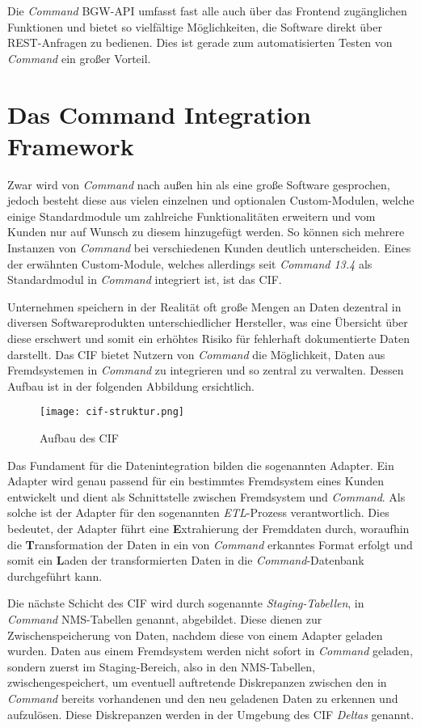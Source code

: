 Die \textit{Command} \ac{BGW}-\ac{API} umfasst fast alle auch über das Frontend zugänglichen Funktionen und bietet so vielfältige Möglichkeiten, die Software direkt über \ac{REST}-Anfragen zu bedienen. Dies ist gerade zum automatisierten Testen von \textit{Command} ein großer Vorteil.


\section{Das Command Integration Framework}\label{sec:cif}
Zwar wird von \textit{Command} nach außen hin als eine große Software gesprochen, jedoch besteht diese aus vielen einzelnen und optionalen Custom-Modulen, welche einige Standardmodule um zahlreiche Funktionalitäten erweitern und vom Kunden nur auf Wunsch zu diesem hinzugefügt werden. So können sich mehrere Instanzen von \textit{Command} bei verschiedenen Kunden deutlich unterscheiden. Eines der erwähnten Custom-Module, welches allerdings seit \textit{Command 13.4} als Standardmodul in \textit{Command} integriert ist, ist das \acf{CIF}.

Unternehmen speichern in der Realität oft große Mengen an Daten dezentral in diversen Softwareprodukten unterschiedlicher Hersteller, was eine Übersicht über diese erschwert und somit ein erhöhtes Risiko für fehlerhaft dokumentierte Daten darstellt. Das \ac{CIF} bietet Nutzern von \textit{Command} die Möglichkeit, Daten aus Fremdsystemen in \textit{Command} zu integrieren und so zentral zu verwalten. Dessen Aufbau ist in der folgenden Abbildung ersichtlich.

\begin{figure}[h]
    \centering
    \texttt{[image: cif-struktur.png]}
    \caption{Aufbau des \ac{CIF}}
\end{figure}

Das Fundament für die Datenintegration bilden die sogenannten Adapter. Ein Adapter wird genau passend für ein bestimmtes Fremdsystem eines Kunden entwickelt und dient als Schnittstelle zwischen Fremdsystem und \textit{Command}. Als solche ist der Adapter für den sogenannten \textit{ETL}-Prozess verantwortlich. Dies bedeutet, der Adapter führt eine \textbf{E}xtrahierung der Fremddaten durch, woraufhin die \textbf{T}ransformation der Daten in ein von \textit{Command} erkanntes Format erfolgt und somit ein \textbf{L}aden der transformierten Daten in die \textit{Command}-Datenbank durchgeführt kann.

Die nächste Schicht des \ac{CIF} wird durch sogenannte \textit{Staging-Tabellen}, in \textit{Command} \ac{NMS}-Tabellen genannt, abgebildet. Diese dienen zur Zwischenspeicherung von Daten, nachdem diese von einem Adapter geladen wurden. Daten aus einem Fremdsystem werden nicht sofort in \textit{Command} geladen, sondern zuerst im Staging-Bereich, also in den \ac{NMS}-Tabellen, zwischengespeichert, um eventuell auftretende Diskrepanzen zwischen den in \textit{Command} bereits vorhandenen und den neu geladenen Daten zu erkennen und aufzulösen. Diese Diskrepanzen werden in der Umgebung des \ac{CIF} \textit{Deltas} genannt.

